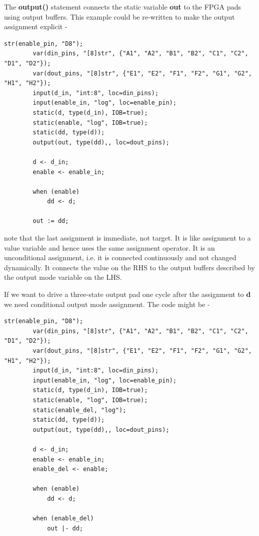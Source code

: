 \documentclass[10pt,a4paper,twoside,fleqn]{article}
\newcommand{\var}[1]{{\bf #1}} %
\begin{document}
    The \var{output()} statement connects the static variable {\bf out} to the FPGA
    pads using output buffers. This example could be re-written to make the
    output assignment explicit -
    
    \begin{lstlisting}[language=threepl]
        str(enable_pin, "D8");
        var(din_pins, "[8]str", {"A1", "A2", "B1", "B2", "C1", "C2", "D1", "D2"});
        var(dout_pins, "[8]str", {"E1", "E2", "F1", "F2", "G1", "G2", "H1", "H2"});
        input(d_in, "int:8", loc=din_pins);
        input(enable_in, "log", loc=enable_pin);
        static(d, type(d_in), IOB=true);
        static(enable, "log", IOB=true);       
        static(dd, type(d));
        output(out, type(dd),, loc=dout_pins);

        d <- d_in;
        enable <- enable_in;

        when (enable)
            dd <- d;
        
        out := dd;
    \end{lstlisting}
    
    note that the last assignment is immediate, not target. It is like assignment
    to a value variable and hence uses the same assignment operator. It is
    an unconditional assignment, i.e. it is connected continuously and not
    changed dynamically. It connects
    the value on the RHS to the output buffers described by the output mode
    variable on the LHS.
   
    If we want to drive a three-state output pad one cycle after the assignment
    to \var{d} we need conditional output mode assignment. The code might be -

    \begin{lstlisting}[language=threepl]
        str(enable_pin, "D8");
        var(din_pins, "[8]str", {"A1", "A2", "B1", "B2", "C1", "C2", "D1", "D2"});
        var(dout_pins, "[8]str", {"E1", "E2", "F1", "F2", "G1", "G2", "H1", "H2"});
        input(d_in, "int:8", loc=din_pins);
        input(enable_in, "log", loc=enable_pin);
        static(d, type(d_in), IOB=true);
        static(enable, "log", IOB=true);       
        static(enable_del, "log");
        static(dd, type(d));
        output(out, type(dd),, loc=dout_pins);

        d <- d_in;
        enable <- enable_in;
        enable_del <- enable;

        when (enable)
            dd <- d;
        
        when (enable_del)
            out |- dd;
    \end{lstlisting}
\end{document}
